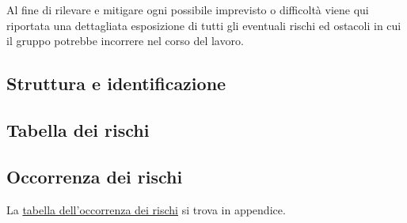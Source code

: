 Al fine di rilevare e mitigare ogni possibile imprevisto o difficoltà viene qui riportata una dettagliata esposizione di tutti gli eventuali rischi ed ostacoli in cui il gruppo \Gruppo{} potrebbe incorrere nel corso del lavoro.

\subsection{Struttura e identificazione}\label{sec:StrutturaRischi}


\subsection{Tabella dei rischi}\label{sec:TabellaRischi}

\hypersetup{
    linkcolor=blue
}
\subsection{Occorrenza dei rischi}\label{sec:OccorrenzaRischi}
La \hyperlink{Tabellaoccorrenzarischi}{tabella dell'occorrenza dei rischi} si trova in appendice.
\hypersetup{
    linkcolor=black
}